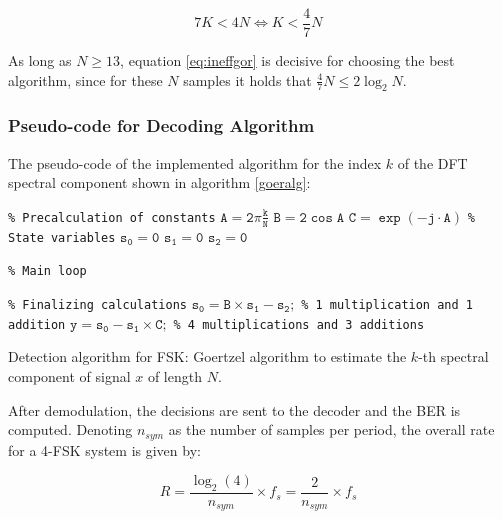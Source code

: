 \documentclass[12pt,a4paper,openright]{report}
\begin{document}
\begin{equation}
7K < 4N \Leftrightarrow K < \frac{4}{7}N\ 
\end{equation}


As long as $N\geq 13$, equation \ref{eq:ineffgor} is decisive for choosing the best algorithm, since for these $N$ samples it holds that $\frac{4}{7} N \leq 2 \log_2 N$.


\subsubsection{Pseudo-code for Decoding Algorithm}
The pseudo-code of the implemented algorithm for the index $k$ of the DFT spectral component shown in algorithm \ref{goeralg}:  \\

\begin{algorithm}[H]
\SetKwInOut{Input}{input}\SetKwInOut{Output}{output}
\BlankLine
\texttt{\% Precalculation of constants}\;
$\mathtt{ A= 2\pi \frac{k}{N}}$\;
$\mathtt{B = 2\cos{A}}$\;
$\mathtt{C = \exp{(-j \cdot A)}}$\;
\texttt{\% State variables}\;
$\mathtt{s_0=0}$\;
$\mathtt{s_1=0}$\;
$\mathtt{s_2=0}$\;

\texttt{\% Main loop}\;

\texttt{\% Finalizing calculations}\;
$\mathtt{s_0 = B\times s_1 - s_2; }$ \texttt{\% 1 multiplication and 1 addition}\;
$\mathtt{y = s_0 -s_1 \times C; }$  \texttt{\% 4 multiplications and 3 additions}\;
\BlankLine
\BlankLine
\caption{Detection algorithm for FSK: Goertzel algorithm to estimate the $k$-th spectral component of signal $x$ of length $N$.}
\label{goeralg}
\end{algorithm}


After demodulation, the decisions are sent to the decoder and the BER is computed. Denoting $n_{sym}$ as the number of samples per period, the overall rate for a 4-FSK system is given by:

\begin{equation}
R = \frac{\log_2(4)}{n_{sym}}\times f_s = \frac{2}{n_{sym}}\times f_s\ 
\end{equation}
\end{document}
